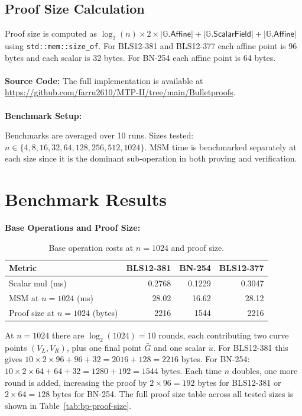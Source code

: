 \subsection{Proof Size Calculation}

Proof size is computed as
$\log_2(n) \times 2 \times |\mathbb{G}.\mathsf{Affine}|
+ |\mathbb{G}.\mathsf{ScalarField}|
+ |\mathbb{G}.\mathsf{Affine}|$
using \texttt{std::mem::size\_of}. For BLS12-381 and BLS12-377
each affine point is 96 bytes and each scalar is 32 bytes. For
BN-254 each affine point is 64 bytes.
\\\\
\textbf{Source Code:}
The full implementation is available at
\url{https://github.com/farru2610/MTP-II/tree/main/Bulletproofs}.
\\\\
\textbf{Benchmark Setup:}

Benchmarks are averaged over 10 runs. Sizes tested:
$n \in \{4, 8, 16, 32, 64, 128, 256, 512, 1024\}$.
MSM time is benchmarked separately at each size since it is the
dominant sub-operation in both proving and verification.

\section{Benchmark Results}

\textbf{Base Operations and Proof Size:}

\begin{table}[H]
\centering
\caption{Base operation costs at $n = 1024$ and proof size.}
\label{tab:bp-base}
\begin{tabular}{lrrr}
\toprule
\textbf{Metric} & \textbf{BLS12-381} & \textbf{BN-254} & \textbf{BLS12-377} \\
\midrule
Scalar mul (ms)              & 0.2768 & 0.1229 & 0.3047 \\
MSM at $n=1024$ (ms)         & 28.02  & 16.62  & 28.12  \\
Proof size at $n=1024$ (bytes) & 2216 & 1544   & 2216   \\
\bottomrule
\end{tabular}
\end{table}

At $n = 1024$ there are $\log_2(1024) = 10$ rounds, each
contributing two curve points $(V_L, V_R)$, plus one final point
$\bar{G}$ and one scalar $\bar{u}$. For BLS12-381 this gives
$10 \times 2 \times 96 + 96 + 32 = 2016 + 128 = 2216$ bytes.
For BN-254: $10 \times 2 \times 64 + 64 + 32 = 1280 + 192 = 1544$ bytes.
Each time $n$ doubles, one more round is added, increasing the proof
by $2 \times 96 = 192$ bytes for BLS12-381 or $2 \times 64 = 128$
bytes for BN-254. The full proof size table across all tested sizes
is shown in Table~\ref{tab:bp-proof-size}.

